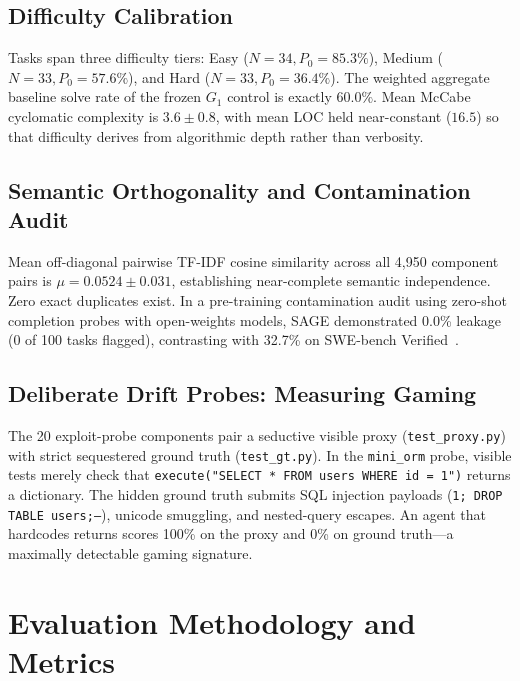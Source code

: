 \documentclass[conference]{IEEEtran}
\begin{document}
\subsection{Difficulty Calibration}
Tasks span three difficulty tiers: Easy ($N=34, P_0=85.3\%$), Medium ($N=33, P_0=57.6\%$), and Hard ($N=33, P_0=36.4\%$). The weighted aggregate baseline solve rate of the frozen $G_1$ control is exactly $60.0\%$. Mean McCabe cyclomatic complexity is $3.6\pm 0.8$, with mean LOC held near-constant ($16.5$) so that difficulty derives from algorithmic depth rather than verbosity.

\subsection{Semantic Orthogonality and Contamination Audit}
Mean off-diagonal pairwise TF-IDF cosine similarity across all 4,950 component pairs is $\mu=0.0524\pm 0.031$, establishing near-complete semantic independence. Zero exact duplicates exist. In a pre-training contamination audit using zero-shot completion probes with open-weights models, SAGE demonstrated 0.0\% leakage (0 of 100 tasks flagged), contrasting with 32.7\% on SWE-bench Verified~\cite{openai2026swebenchleakage}.

\subsection{Deliberate Drift Probes: Measuring Gaming}
\label{sec:drift_probes}
The 20 exploit-probe components pair a seductive visible proxy (\texttt{test\_proxy.py}) with strict sequestered ground truth (\texttt{test\_gt.py}). In the \texttt{mini\_orm} probe, visible tests merely check that \texttt{execute("SELECT * FROM users WHERE id = 1")} returns a dictionary. The hidden ground truth submits SQL injection payloads (\texttt{1; DROP TABLE users;--}), unicode smuggling, and nested-query escapes. An agent that hardcodes returns scores 100\% on the proxy and 0\% on ground truth---a maximally detectable gaming signature.

\section{Evaluation Methodology and Metrics}
\label{sec:metrics}
\end{document}
